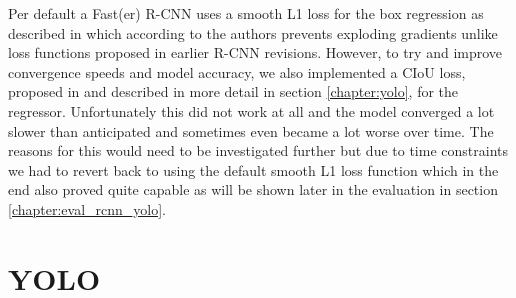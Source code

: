 Per default a Fast(er) R-CNN uses a smooth L1 loss for the box regression as described in \autocite{girshick_fast_2015} which according to the authors prevents exploding gradients unlike loss functions proposed in earlier R-CNN revisions. However, to try and improve convergence speeds and model accuracy, we also implemented a \ac{CIoU} loss, proposed in \autocite{zheng_enhancing_2021} and described in more detail in section \vref{chapter:yolo}, for the regressor. Unfortunately this did not work at all and the model converged a lot slower than anticipated and sometimes even became a lot worse over time. The reasons for this would need to be investigated further but due to time constraints we had to revert back to using the default smooth L1 loss function which in the end also proved quite capable as will be shown later in the evaluation in section \vref{chapter:eval_rcnn_yolo}.

\section{YOLO}\label{chapter:yolo}

